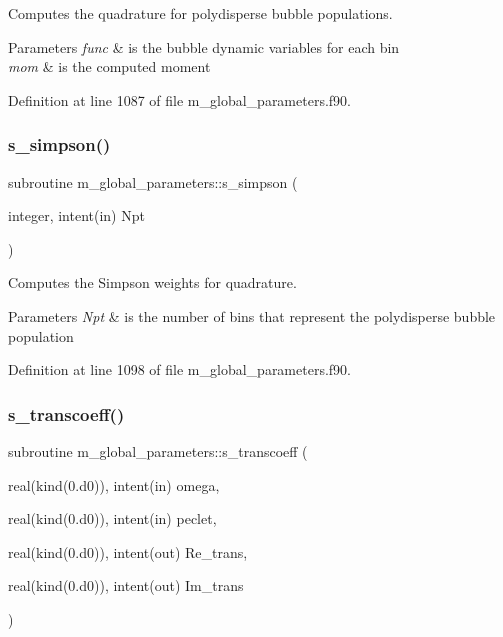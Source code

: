 Computes the quadrature for polydisperse bubble populations. 


\begin{DoxyParams}{Parameters}
{\em func} & is the bubble dynamic variables for each bin \\
\hline
{\em mom} & is the computed moment \\
\hline
\end{DoxyParams}


Definition at line 1087 of file m\+\_\+global\+\_\+parameters.\+f90.

\mbox{\label{namespacem__global__parameters_a78f4bf8bb59af4396bf11aca330463ec}} 
\subsubsection{\texorpdfstring{s\+\_\+simpson()}{s\_simpson()}}
{\footnotesize\ttfamily subroutine m\+\_\+global\+\_\+parameters\+::s\+\_\+simpson (\begin{DoxyParamCaption}\item[{integer, intent(in)}]{Npt }\end{DoxyParamCaption})}



Computes the Simpson weights for quadrature. 


\begin{DoxyParams}{Parameters}
{\em Npt} & is the number of bins that represent the polydisperse bubble population \\
\hline
\end{DoxyParams}


Definition at line 1098 of file m\+\_\+global\+\_\+parameters.\+f90.

\mbox{\label{namespacem__global__parameters_af52b102f1c17e28aa4ca3070f8806ca6}} 
\subsubsection{\texorpdfstring{s\+\_\+transcoeff()}{s\_transcoeff()}}
{\footnotesize\ttfamily subroutine m\+\_\+global\+\_\+parameters\+::s\+\_\+transcoeff (\begin{DoxyParamCaption}\item[{real(kind(0.d0)), intent(in)}]{omega,  }\item[{real(kind(0.d0)), intent(in)}]{peclet,  }\item[{real(kind(0.d0)), intent(out)}]{Re\+\_\+trans,  }\item[{real(kind(0.d0)), intent(out)}]{Im\+\_\+trans }\end{DoxyParamCaption})}



